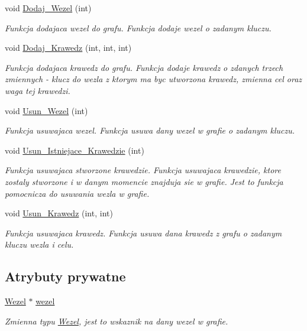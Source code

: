 \begin{DoxyCompactItemize}
void \hyperlink{class_graf_a0bd61f77e5effca3dc5d15a2369af18c}{\-Dodaj\-\_\-\-Wezel} (int)
\begin{DoxyCompactList}\small\item\em \-Funkcja dodajaca wezel do grafu. \-Funkcja dodaje wezel o zadanym kluczu. \end{DoxyCompactList}\item 
void \hyperlink{class_graf_aa74b3dfd5b06687670ebed618602115d}{\-Dodaj\-\_\-\-Krawedz} (int, int, int)
\begin{DoxyCompactList}\small\item\em \-Funkcja dodajaca krawedz do grafu. \-Funkcja dodaje krawedz o zdanych trzech zmiennych -\/ klucz do wezla z ktorym ma byc utworzona krawedz, zmienna cel oraz waga tej krawedzi. \end{DoxyCompactList}\item 
void \hyperlink{class_graf_a15e1c56c11939feec1a7f6a02617d6f4}{\-Usun\-\_\-\-Wezel} (int)
\begin{DoxyCompactList}\small\item\em \-Funkcja usuwajaca wezel. \-Funkcja usuwa dany wezel w grafie o zadanym kluczu. \end{DoxyCompactList}\item 
void \hyperlink{class_graf_ac007a6830e12861f5171ae4d1efc8f21}{\-Usun\-\_\-\-Istniejace\-\_\-\-Krawedzie} (int)
\begin{DoxyCompactList}\small\item\em \-Funkcja usuwajaca stworzone krawedzie. \-Funkcja usuwajaca krawedzie, ktore zostaly stworzone i w danym momencie znajduja sie w grafie. \-Jest to funkcja pomocnicza do usuwania wezla w grafie. \end{DoxyCompactList}\item 
void \hyperlink{class_graf_a8e1326354ca128e984b222e27725fde5}{\-Usun\-\_\-\-Krawedz} (int, int)
\begin{DoxyCompactList}\small\item\em \-Funkcja usuwajaca krawedz. \-Funkcja usuwa dana krawedz z grafu o zadanym kluczu wezla i celu. \end{DoxyCompactList}\end{DoxyCompactItemize}
\subsection*{\-Atrybuty prywatne}
\begin{DoxyCompactItemize}
\item 
\hyperlink{class_graf_1_1_wezel}{\-Wezel} $\ast$ \hyperlink{class_graf_a2a803d800eeb0f46bcf4a954083f157c}{wezel}
\begin{DoxyCompactList}\small\item\em \-Zmienna typu \hyperlink{class_graf_1_1_wezel}{\-Wezel}, jest to wskaznik na dany wezel w grafie. \end{DoxyCompactList}\end{DoxyCompactItemize}
